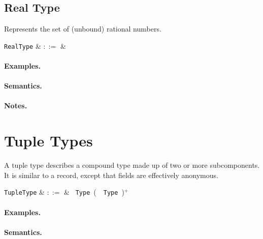 
\subsection{Real Type}

Represents the set of (unbound) rational numbers.

\begin{syntax}
  \verb+RealType+ & $::=$ &  \\
\end{syntax}

\paragraph{Examples.}

\paragraph{Semantics.}

\paragraph{Notes.} 


\section{Tuple Types}

A tuple type describes a compound type made up of two or more subcomponents. It is similar to a record, except that fields are effectively anonymous.

\begin{syntax}
  \verb+TupleType+ & $::=$ & \token{(}\ \verb+Type+\ \big(\ \token{,}\
  \verb+Type+\ \big)$^+$\ \token{)}\\
\end{syntax}

\paragraph{Examples.}

\paragraph{Semantics.}

